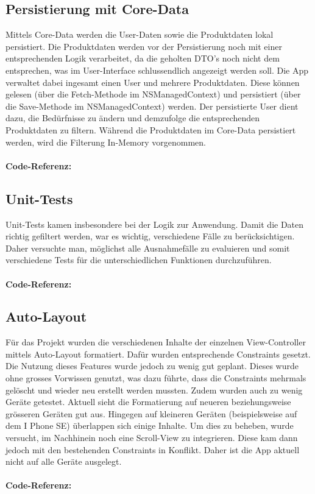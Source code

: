 \documentclass[12pt,titlepage]{article}
\begin{document}
\subsection{Persistierung mit Core-Data}
Mittels Core-Data werden die User-Daten sowie die Produktdaten lokal persistiert. Die Produktdaten werden vor der Persistierung noch mit einer entsprechenden Logik verarbeitet, da die geholten DTO's noch nicht dem entsprechen, was im User-Interface schlussendlich angezeigt werden soll. Die App verwaltet dabei ingesamt einen User und mehrere Produktdaten. Diese können gelesen (über die Fetch-Methode im NSManagedContext) und persistiert (über die Save-Methode im NSManagedContext) werden. Der persistierte User dient dazu, die Bedürfnisse zu ändern und demzufolge die entsprechenden Produktdaten zu filtern. Während die Produktdaten im Core-Data persistiert werden, wird die Filterung In-Memory vorgenommen.\\
\\
\textbf{Code-Referenz: }\\ 

\subsection{Unit-Tests}
Unit-Tests kamen insbesondere bei der Logik zur Anwendung. Damit die Daten richtig gefiltert werden, war es wichtig, verschiedene Fälle zu berücksichtigen. Daher versuchte man, möglichst alle Ausnahmefälle zu evaluieren und somit verschiedene Tests für die unterschiedlichen Funktionen durchzuführen.\\
\\
\textbf{Code-Referenz: }\\ 

\subsection{Auto-Layout}
Für das Projekt wurden die verschiedenen Inhalte der einzelnen View-Controller mittels Auto-Layout formatiert. Dafür wurden entsprechende Constraints gesetzt. Die Nutzung dieses Features wurde jedoch zu wenig gut geplant. Dieses wurde ohne grosses Vorwissen genutzt, was dazu führte, dass die Constraints mehrmals gelöscht und wieder neu erstellt werden mussten. Zudem wurden auch zu wenig Geräte getestet. Aktuell sieht die Formatierung auf neueren beziehungsweise grösseren Geräten gut aus. Hingegen auf kleineren Geräten (beispielsweise auf dem I Phone SE) überlappen sich einige Inhalte. Um dies zu beheben, wurde versucht, im Nachhinein noch eine Scroll-View zu integrieren. Diese kam dann jedoch mit den bestehenden Constraints in Konflikt. Daher ist die App aktuell nicht auf alle Geräte ausgelegt.\\
\\
\textbf{Code-Referenz: }\\ 
\end{document}
